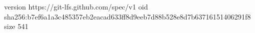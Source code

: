 version https://git-lfs.github.com/spec/v1
oid sha256:b7ef6a1a3c485357eb2eacad633ff8d9eeb7d88b528e8d7b63716151406291f8
size 541
